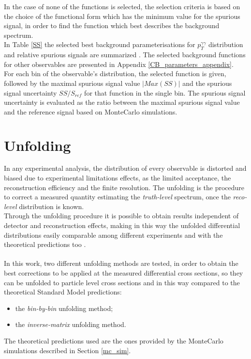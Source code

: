 In the case of none of the functions is selected, the selection criteria is based on the choice of the functional form which has the minimum value for the spurious signal, in order to find the function which best describes the background spectrum.
\\
In Table \ref{SS} the selected best background parameterisations for $p_T^{\gamma\gamma}$ distribution and relative spurious signals are summarized . The selected background functions for other observables are presented in Appendix \ref{CB_parameters_appendix}.
\\
For each bin of the observable's distribution, the selected function is given, followed by the maximal spurious signal value $|Max(SS)|$ and the spurious signal uncertainty $SS/S_{ref}$ for that function in the single bin. The spurious signal uncertainty is evaluated as the ratio between the maximal spurious signal value and the reference signal based on MonteCarlo simulations.

\section{Unfolding}
In any experimental analysis, the distribution of every observable is distorted and biased due to experimental limitations effects, as the limited acceptance, the reconstruction efficiency and the finite resolution. The unfolding is the procedure to correct a measured quantity estimating the \emph{truth-level} spectrum, once the \emph{reco-level} distribution is known.
\\
Through the unfolding procedure it is possible to obtain results independent of detector and reconstruction effects, making in this way the unfolded differential distributions easily comparable among different experiments and with the theoretical predictions too \cite{refId0}.
\\\\
In this work, two different unfolding methods are tested, in order to obtain the best corrections to be applied at the measured differential cross sections, so they can be unfolded to particle level cross sections and in this way compared to the theoretical Standard Model predictions:
\begin{itemize}
\item the \emph{bin-by-bin} unfolding method;
\item the \emph{inverse-matrix} unfolding method.
\end{itemize}
The theoretical predictions used are the ones provided by the MonteCarlo simulations described in Section \ref{mc_sim}.

